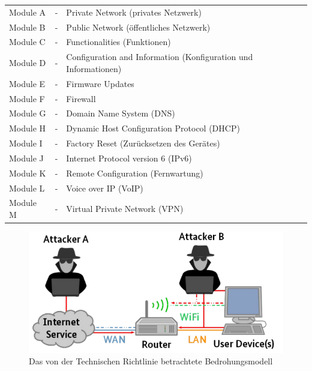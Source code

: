 \documentclass[a4paper]{book}
\begin{document}
\begin{large}
\begin{table}[ht]
\centering
\begin{tabular}{lcl}
Module A & - & Private Network (privates Netzwerk)                             \\
Module B & - & Public Network (öffentliches Netzwerk)                          \\
Module C & - & Functionalities (Funktionen)                                    \\
Module D & - & Configuration and Information (Konfiguration und Informationen) \\
Module E & - & Firmware Updates                                                \\
Module F & - & Firewall                                                        \\
Module G & - & Domain Name System (DNS)                                        \\
Module H & - & Dynamic Host Configuration Protocol (DHCP)                      \\
Module I & - & Factory Reset (Zurücksetzen des Gerätes)                        \\
Module J & - & Internet Protocol version 6 (IPv6)                              \\
Module K & - & Remote Configuration (Fernwartung)                              \\
Module L & - & Voice over IP (VoIP)                                            \\
Module M & - & Virtual Private Network (VPN)                                  
\end{tabular}
\end{table}

\begin{onehalfspace}

\begin{figure}[ht]
\begin{center}
\includegraphics[scale=0.5]{images/threat.png} 
\caption{Das von der Technischen Richtlinie betrachtete Bedrohungsmodell \cite{BundesamtfurSicherheitinderInformationstechnik.e}}
\label{fig:threat}
\end{center}
\end{figure}



\end{onehalfspace}
\end{large}
\end{document}
